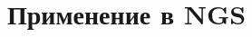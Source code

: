 \documentclass[conference]{IEEEtran} \IEEEoverridecommandlockouts
\begin{document}
\section{Применение в NGS} \label{sec:ngs-appl} 
\end{document}
